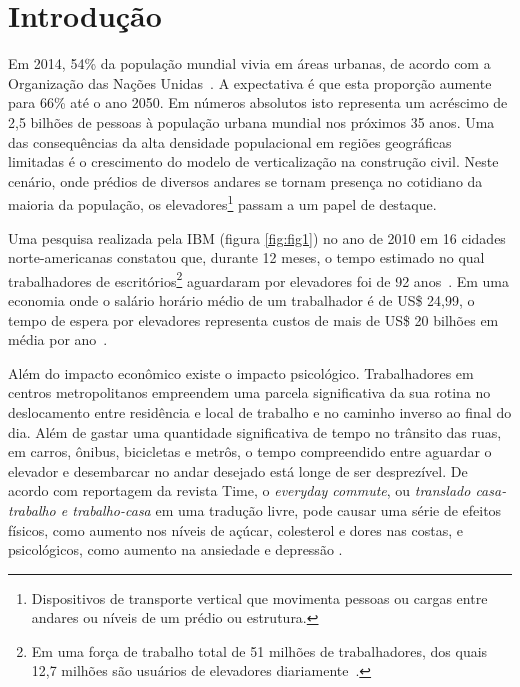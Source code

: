 \chapter{\label{chap:intro}Introdução}


Em 2014, 54\% da população mundial vivia em áreas urbanas, de acordo com a
Organização das Nações Unidas~\cite{UN14}. A expectativa é que esta proporção
aumente para 66\% até o ano 2050. Em números absolutos isto representa um
acréscimo de 2,5 bilhões de pessoas à população urbana mundial nos próximos 35
anos. Uma das consequências da alta densidade populacional em regiões
geográficas limitadas é o crescimento do modelo de verticalização na construção
civil. Neste cenário, onde prédios de diversos andares se tornam presença no
cotidiano da maioria da população, os elevadores\footnote{Dispositivos de
transporte vertical que movimenta pessoas ou cargas entre andares ou níveis de
um prédio ou estrutura.} passam a um papel de destaque.

Uma pesquisa realizada pela IBM (figura \ref{fig:fig1}) no ano de 2010 em 16
cidades norte-americanas constatou que, durante 12 meses, o tempo estimado no
qual trabalhadores de escritórios\footnote{Em uma força de trabalho total de 51
milhões de trabalhadores, dos quais 12,7 milhões são usuários de elevadores
diariamente~\cite{IBM10}.} aguardaram por elevadores foi de 92
anos~\cite{IBM10}. Em uma economia onde o salário horário médio de um
trabalhador é de US\$ 24,99, o tempo de espera por elevadores representa custos
de mais de US\$ 20 bilhões em média por ano~\cite{BLS15}.

Além do impacto econômico existe o impacto psicológico. Trabalhadores em centros
metropolitanos empreendem uma parcela significativa da sua rotina no
deslocamento entre residência e local de trabalho e no caminho inverso ao final
do dia. Além de gastar uma quantidade significativa de tempo no trânsito das
ruas, em carros, ônibus, bicicletas e metrôs, o tempo compreendido entre
aguardar o elevador e desembarcar no andar desejado está longe de ser
desprezível. De acordo com reportagem da revista Time, o \textit{everyday
commute}, ou \textit{translado casa-trabalho e trabalho-casa} em uma tradução
livre, pode causar uma série de efeitos físicos, como aumento nos níveis de
açúcar, colesterol e dores nas costas, e psicológicos, como aumento na ansiedade
e depressão \cite{Kylstra14}.

